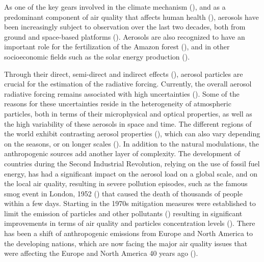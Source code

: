 \documentclass[journal abbreviation, manuscript]{copernicus}
\begin{document}


\introduction  %
As one of the key gears involved in the climate mechanism (\cite{poschl2005atmospheric}), and as a predominant component of air quality that affects human health (\cite{burnett2014integrated}), aerosols have been increasingly subject to observation over the last two decades, both from ground and space-based platforms (\cite{holben2001emerging,kaufman2002satellite}).  Aerosols are also recognized to have an important role for the fertilization of the Amazon forest (\cite{yu2015fertilizing}), and in other socioeconomic fields such as the solar energy production (\cite{Li11867,labordena2018blue}).

Through their direct, semi-direct and indirect effects (\cite{rap2013natural,johnson2004semi,lohmann2005global}), aerosol particles are crucial for the estimation of the radiative forcing. Currently, the overall aerosol radiative forcing remains associated with high uncertainties (\cite{haywood2000estimates, stocker2014climate}). Some of the reasons for these uncertainties reside in the heterogeneity of atmospheric particles, both in terms of their microphysical and optical properties, as well as the high variability of these aerosols in space and time. The different regions of the world exhibit contrasting aerosol properties (\cite{holben2001emerging}), which can also vary depending on the seasons, or on longer scales (\cite{streets2009anthropogenic}). In addition to the natural modulations, the anthropogenic sources add another layer of complexity. The development of countries during the Second Industrial Revolution, relying on the use of fossil fuel energy, has had a significant impact on the aerosol load on a global scale, and on the local air quality, resulting in severe pollution episodes, such as the famous smog event in London, 1952 (\cite{bell2004retrospective}) that caused the death of thousands of people within a few days.
Starting in the 1970s mitigation measures were established to limit the emission of particles and other pollutants (\cite{bryner1995blue,turnock2016impact}) resulting in significant improvements in terms of air quality and particles concentration levels (\cite{likens2001long}). There has been a shift of anthropogenic emissions from Europe and North America to the developing nations, which are now facing the major air quality issues that were affecting the Europe and North America 40 years ago (\cite{streets2008aerosol,ramachandran2012aerosol}).
\end{document}
